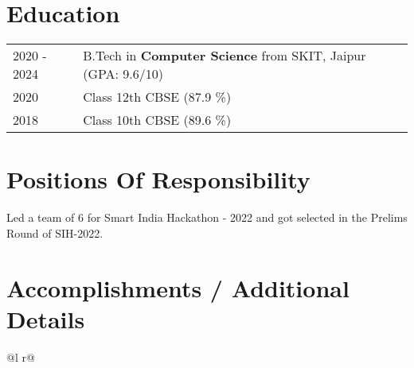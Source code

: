 \documentclass[a4paper,12pt]{article}
\begin{document}
\section{Education}
\begin{tabularx}{\linewidth}{@{}l X@{}}
2020 - 2024 & B.Tech in \textbf{Computer Science} from SKIT, Jaipur \hfill (GPA: 9.6/10) \\ 

2020 & Class 12th CBSE \hfill  (87.9 \%) \\

2018 & Class 10th CBSE \hfill  (89.6 \%) \\
\end{tabularx}



\section{Positions Of Responsibility}
Led a team of 6 for Smart India Hackathon - 2022 and got selected in the Prelims Round of
SIH-2022.

\section{Accomplishments / Additional Details}
\begin{tabularx}{\linewidth}{ @{}l r@{} }
\end{tabularx}
\end{document}
